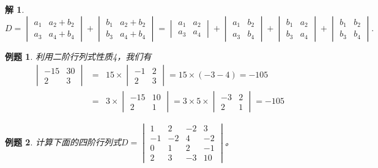 \documentclass[a4paper]{book}
\newtheorem{eg}{例题}[chapter]
\newtheorem*{solution}{解}
\begin{document}
\begin{solution}
$$D = \begin{vmatrix}
a_1 & a_2 + b_2 \\ a_3 & a_4 + b_4 \end{vmatrix} + \begin{vmatrix}
b_1 & a_2 + b_2 \\ b_3 & a_4 + b_4 \end{vmatrix} = \begin{vmatrix}
a_1 & a_2 \\ a_3 & a_4 \end{vmatrix} + \begin{vmatrix}
a_1 & b_2 \\ a_3 & b_4 \end{vmatrix} + \begin{vmatrix}
b_1 & a_2 \\ b_3 & a_4 \end{vmatrix} + \begin{vmatrix}
b_1 & b_2 \\ b_3 & b_4 \end{vmatrix}.$$
\end{solution}

\begin{eg} 利用二阶行列式性质4，我们有
\begin{eqnarray*}
\begin{vmatrix} -15 & 30 \\ 2 & 3 \end{vmatrix} & = & 15 \times \begin{vmatrix} -1 & 2 \\ 2 & 3 \end{vmatrix} = 15 \times (-3-4) = -105 \\
& = & 3 \times \begin{vmatrix} -15 & 10 \\ 2 & 1 \end{vmatrix} = 3 \times 5 \times \begin{vmatrix} -3 & 2 \\ 2 & 1 \end{vmatrix} = -105
\end{eqnarray*}
\end{eg}

\begin{eg}
计算下面的四阶行列式$D = \begin{vmatrix} 1 & 2 & -2 & 3 \\ -1 & -2 & 4 & -2 \\ 0 & 1 & 2 & -1 \\ 2 & 3 & -3 & 10 \end{vmatrix}$。
\end{eg}
\end{document}
